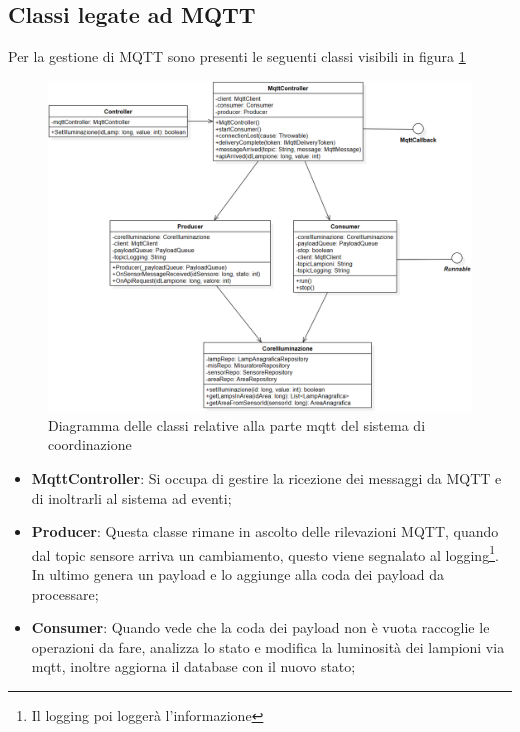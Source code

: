 \subsection{Classi legate ad MQTT}

Per la gestione di MQTT sono presenti le seguenti classi visibili in figura \ref{fig:coordinazione_mqtt}

\begin{figure}[h]
    \centering
    \includegraphics[width=\textwidth]{img/illuminazione_mqtt.png}
    \caption{Diagramma delle classi relative alla parte mqtt del sistema di coordinazione}
    \label{fig:coordinazione_mqtt}
\end{figure}


\begin{itemize}
    \item \textbf{MqttController}: Si occupa di gestire la ricezione dei messaggi da MQTT e di inoltrarli al sistema ad eventi;
    \item \textbf{Producer}: Questa classe rimane in ascolto delle rilevazioni MQTT, quando dal topic sensore arriva un cambiamento, questo viene segnalato al logging\footnote{Il logging poi loggerà l'informazione}. In ultimo genera un payload e lo aggiunge alla coda dei payload da processare;
    \item \textbf{Consumer}: Quando vede che la coda dei payload non è vuota raccoglie le operazioni da fare, analizza lo stato e modifica la luminosità dei lampioni via mqtt, inoltre aggiorna il database con il nuovo stato;
\end{itemize}

